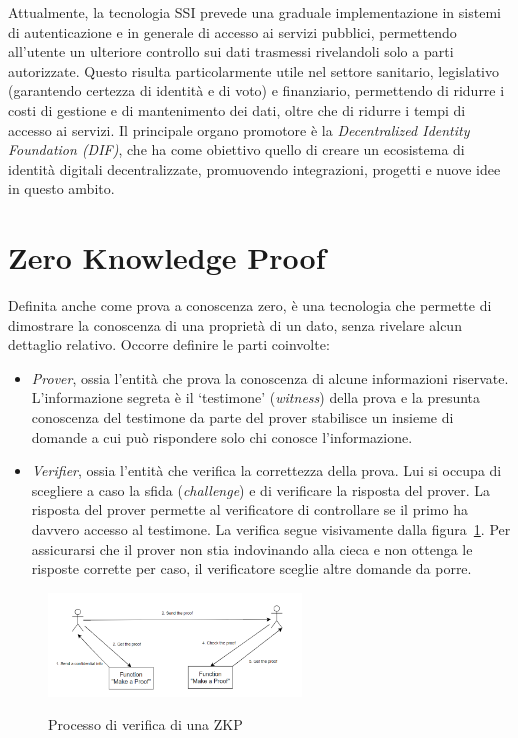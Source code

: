 Attualmente, la tecnologia SSI prevede una graduale implementazione in sistemi di autenticazione e
in generale di accesso ai servizi pubblici, permettendo all'utente un ulteriore controllo
sui dati trasmessi rivelandoli solo a parti autorizzate.
Questo risulta particolarmente utile nel settore sanitario, legislativo (garantendo certezza di identità e di voto) e finanziario,
permettendo di ridurre i costi di gestione e di mantenimento dei dati, oltre che di ridurre i tempi di accesso ai servizi.
Il principale organo promotore è la \textit{Decentralized Identity Foundation (DIF)}, che ha come obiettivo quello di creare
un ecosistema di identità digitali decentralizzate, promuovendo integrazioni, progetti e nuove idee in questo ambito. 

\section{Zero Knowledge Proof}\label{sec:zero-knowledge-proof}
Definita anche come prova a conoscenza zero, è una tecnologia che permette di dimostrare la conoscenza di una proprietà di un dato,
senza rivelare alcun dettaglio relativo.
Occorre definire le parti coinvolte:
\begin{itemize}
    \item \textit{Prover}, ossia l'entità che prova la conoscenza di alcune informazioni riservate. 
    L'informazione segreta è il `testimone' (\textit{witness}) della prova e la presunta conoscenza del testimone da parte del prover stabilisce un insieme di domande a cui può rispondere solo chi conosce l'informazione. 
    \item \textit{Verifier}, ossia l'entità che verifica la correttezza della prova. Lui si occupa di scegliere a caso la sfida (\textit{challenge}) e di verificare la risposta del prover.
    La risposta del prover permette al verificatore di controllare se il primo ha davvero accesso al testimone. La verifica segue visivamente dalla figura~\ref{fig:zkp}. 
    Per assicurarsi che il prover non stia indovinando alla cieca e non ottenga le risposte corrette per caso, il verificatore sceglie altre domande da porre.
\end{itemize}

\begin{figure}[h] 
    \centering
    \includegraphics[width=0.6\textwidth, alt={Come funziona la verifica nella ZKP}]{immagini/zkp.png}
    \caption{Processo di verifica di una ZKP}\label{fig:zkp}
\end{figure}


